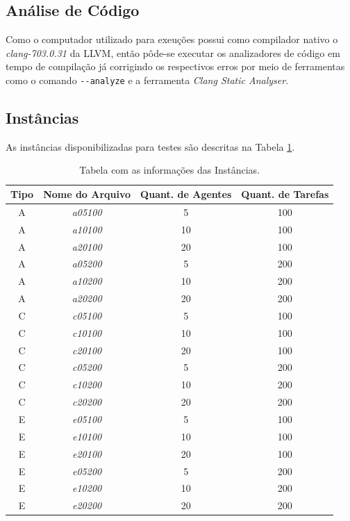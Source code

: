 \documentclass[portugues, brazil, a4paper,12pt]{article}
\begin{document}
	\subsection{Análise de Código}
		Como o computador utilizado para exeuções possui como compilador nativo o \textit{clang-703.0.31} da LLVM, então pôde-se executar os analizadores de código em tempo de compilação já corrigindo os respectivos erros por meio de ferramentas como o comando \verb|--analyze| e a ferramenta \textit{Clang Static Analyser}.
	
	\subsection{Instâncias}
		As instâncias disponibilizadas para testes são descritas na Tabela \ref{tab:inst}.
	
		\begin{table}[H]
			\centering
			\caption{Tabela com as informações das Instâncias.} \label{tab:inst}
			\begin{tabular}{cc|cc}
				\hline
				\textbf{Tipo} & \textbf{Nome do Arquivo} & \textbf{Quant. de Agentes} & \textbf{Quant. de Tarefas} \\ \hline \hline
				A & \textit{a05100} & 5   & 100 \\
				A & \textit{a10100} & 10  & 100 \\
				A & \textit{a20100} & 20  & 100 \\
				A & \textit{a05200} & 5   & 200 \\
				A & \textit{a10200} & 10  & 200 \\
				A & \textit{a20200} & 20  & 200 \\ \hline
				C & \textit{c05100} & 5   & 100 \\
				C & \textit{c10100} & 10  & 100 \\
				C & \textit{c20100} & 20  & 100 \\
				C & \textit{c05200} & 5   & 200 \\
				C & \textit{c10200} & 10  & 200 \\
				C & \textit{c20200} & 20  & 200 \\ \hline
				E & \textit{e05100} & 5   & 100 \\
				E & \textit{e10100} & 10  & 100 \\
				E & \textit{e20100} & 20  & 100 \\
				E & \textit{e05200} & 5   & 200 \\
				E & \textit{e10200} & 10  & 200 \\
				E & \textit{e20200} & 20  & 200 \\ \hline
			\end{tabular}
		\end{table}
		
\end{document}
